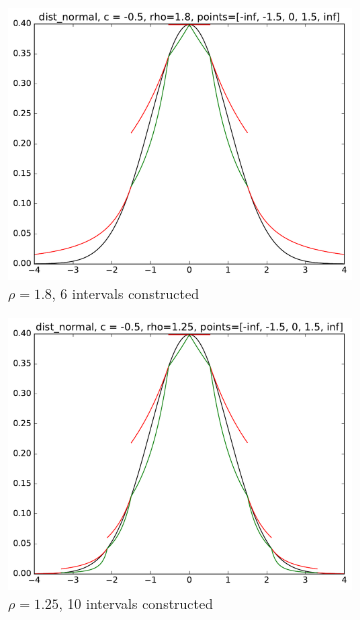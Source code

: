 \begin{figure}
    \centering
    \begin{subfigure}[b]{0.49\textwidth}
        \includegraphics[width=\textwidth]{figs/tf_example_normal_6.pdf}
        \caption{$\rho = 1.8$, 6 intervals constructed}
    \end{subfigure}
    \begin{subfigure}[b]{0.49\textwidth}
        \includegraphics[width=\textwidth]{figs/tf_example_normal_10.pdf}
        \caption{$\rho = 1.25$, 10 intervals constructed}
    \end{subfigure}
    \centering
    \begin{subfigure}[b]{0.49\textwidth}

\end{subfigure}
\end{figure}
